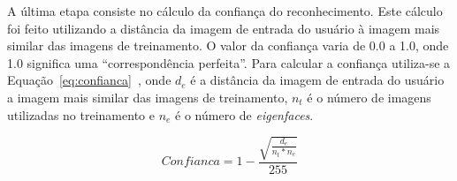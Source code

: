		A última etapa consiste no cálculo da confiança do reconhecimento. Este cálculo foi feito utilizando a distância da imagem de entrada do usuário à imagem mais similar das imagens de treinamento. O valor da confiança varia de 0.0 a 1.0, onde 1.0 significa uma ``correspondência perfeita''. Para calcular a confiança utiliza-se a Equação~\ref{eq:confianca}~\cite{shervin}, onde $\displaystyle d_e$ é a distância da imagem de entrada do usuário a imagem mais similar das imagens de treinamento, $\displaystyle n_t$ é o número de imagens utilizadas no treinamento e $\displaystyle n_e$ é o número de \textit{eigenfaces}.


		\begin{equation}
			\label{eq:confianca}
			Confianca = 1 - \frac{\sqrt{\frac{d_e}{n_t * n_e}}}{255}
		\end{equation}





















